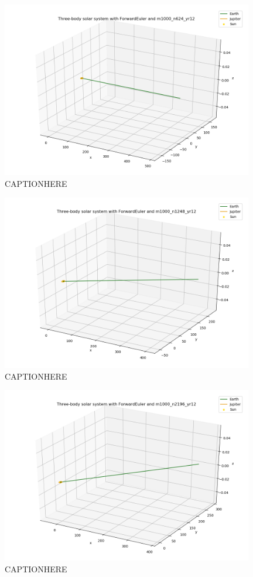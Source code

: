 \documentclass{article}
\begin{document}
    \begin{figure}[H]
        \centering
        \includegraphics[width = 11cm]{img/plot3D_S_E_J_F_m1000_n624_yr12.png}
        \caption{CAPTIONHERE}
        \label{fig:plot3D_S_E_J_F_m1000_n624_yr12}
    \end{figure}

    \begin{figure}[H]
        \centering
        \includegraphics[width = 11cm]{img/plot3D_S_E_J_F_m1000_n1248_yr12.png}
        \caption{CAPTIONHERE}
        \label{fig:plot3D_S_E_J_F_m1000_n1248_yr12}
    \end{figure}

    \begin{figure}[H]
        \centering
        \includegraphics[width = 11cm]{img/plot3D_S_E_J_F_m1000_n2196_yr12.png}
        \caption{CAPTIONHERE}
        \label{fig:plot3D_S_E_J_F_m1000_n2196_yr12}
    \end{figure}
\end{document}
